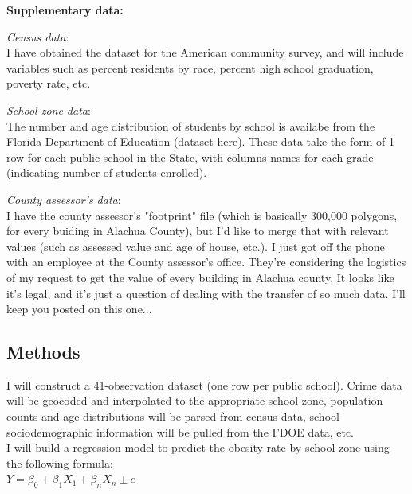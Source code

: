 \documentclass[11pt]{article}
\begin{document}
\begin{multicols}{2}
\noindent \textbf{Supplementary data:} 

\noindent \emph{Census data}:\\
I have obtained the dataset for the American community survey, and will include variables such as percent residents by race, percent high school graduation, poverty rate, etc. 

\noindent \emph{School-zone data}:\\
The number and age distribution of students by school is availabe from the Florida Department of Education \href{https://www.google.com/url?sa=t&rct=j&q=&esrc=s&source=web&cd=2&ved=0CCkQFjAB&url=http\%3A\%2F\%2Fwww.fldoe.org\%2Feias\%2Feiaspubs\%2Fxls\%2Fmem_schl_grd1213.xls&ei=f9g-VJCyMJPFggST74GIBQ&usg=AFQjCNHq9kdEGyKh3oeVRLBCxL9viap8Fw&sig2=cF9UQPhEMxL_clii_vIgrg&bvm=bv.77412846,d.eXY&cad=rja}{(dataset here)}.  These data take the form of 1 row for each public school in the State, with columns names for each grade (indicating number of students enrolled).

\noindent \emph{County assessor's data}:\\
I have the county assessor's "footprint" file (which is basically 300,000 polygons, for every buiding in Alachua County), but I'd like to merge that with relevant values (such as assessed value and age of house, etc.).  I just got off the phone with an employee at the County assessor's office.  They're considering the logistics of my request to get the value of every building in Alachua county.  It looks like it's legal, and it's just a question of dealing with the transfer of so much data.  I'll keep you posted on this one...


\subsection*{Methods}
I will construct a 41-observation dataset (one row per public school).  Crime data will be geocoded and interpolated to the appropriate school zone, population counts and age distributions will be parsed from census data, school sociodemographic information will be pulled from the FDOE data, etc.  \\

I will build a regression model to predict the obesity rate by school zone using the following formula:  \\

\noindent $ Y = \beta_0+\beta_1 X_1+\beta_n X_n \pm e $ \\


\end{multicols}
\end{document}
